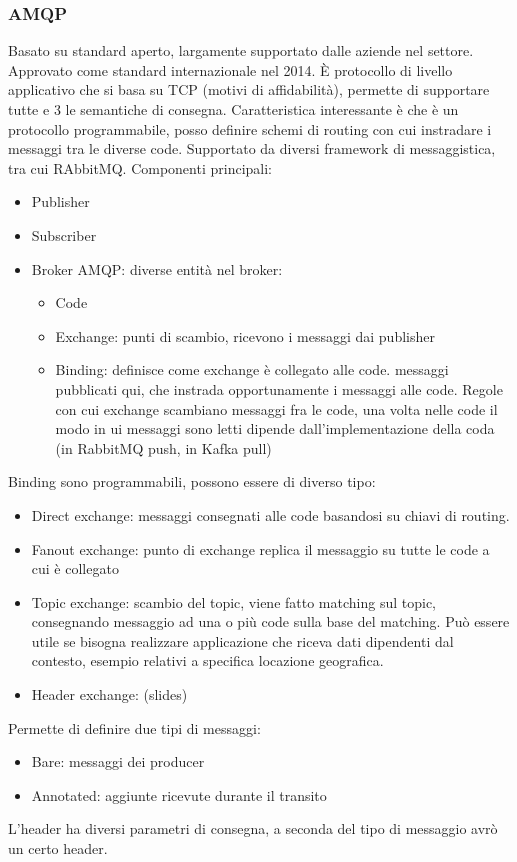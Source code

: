 \documentclass[16px]{article}
\begin{document}
\subsubsection{AMQP}
Basato su standard aperto, largamente supportato dalle aziende nel settore. Approvato come standard internazionale nel 2014. È protocollo di livello applicativo che si basa su TCP (motivi di affidabilità), permette di supportare tutte e 3 le semantiche di consegna. Caratteristica interessante è che è un protocollo programmabile, posso definire schemi di routing con cui instradare i messaggi tra le diverse code. Supportato da diversi framework di messaggistica, tra cui RAbbitMQ. Componenti principali:
\begin{itemize}
\item Publisher
\item Subscriber
\item Broker AMQP: diverse entità nel broker:
\begin{itemize}
\item Code
\item Exchange: punti di scambio, ricevono i messaggi dai publisher
\item Binding: definisce come exchange è collegato alle code. messaggi pubblicati qui, che instrada opportunamente i messaggi alle code. Regole con cui exchange scambiano messaggi fra le code, una volta nelle code il modo in ui messaggi sono letti dipende dall'implementazione della coda (in RabbitMQ push, in Kafka pull)
\end{itemize}
\end{itemize}
Binding sono programmabili, possono essere di diverso tipo:
\begin{itemize}
\item Direct exchange: messaggi consegnati alle code basandosi su chiavi di routing.
\item Fanout exchange: punto di exchange replica il messaggio su tutte le code a cui è collegato
\item Topic exchange: scambio del topic, viene fatto matching sul topic, consegnando messaggio ad una o più code sulla base del matching. Può essere utile se bisogna realizzare applicazione che riceva dati dipendenti dal contesto, esempio relativi a specifica locazione geografica.
\item Header exchange: (slides)
\end{itemize}
Permette di definire due tipi di messaggi:
\begin{itemize}
\item Bare: messaggi dei producer
\item Annotated: aggiunte ricevute durante il transito
\end{itemize}
L'header ha diversi parametri di consegna, a seconda del tipo di messaggio avrò un certo header.
\end{document}
